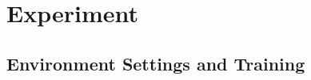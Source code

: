 \documentclass{article}
\begin{document}
\section{Experiment}

\subsection{Environment Settings and Training}
\end{document}
